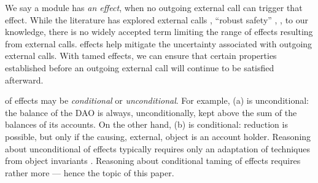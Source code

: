 We say a module has \emph{\tamed an effect}, when no outgoing external call can trigger that effect.
  While the literature has explored external calls \cite{vanproving,cerise-jacm2024,vmsl-pldi2023,ddd}, ``robust safety'' \cite{gordonJefferyRobustSafety,robustSafetyPatrignani,abate2019journey}, \etc, to our knowledge, there is no widely accepted term limiting the range of effects resulting from external calls.
%
\Tamed effects help mitigate the uncertainty associated with outgoing external calls. 
With tamed effects, we can ensure that certain properties established before an outgoing external call will continue to be satisfied afterward.



 
 \Taming of effects may be   \emph{conditional} or \emph{unconditional}.
For example, (a) is unconditional: the balance of the DAO is always, unconditionally, kept above the sum of the balances of its accounts.
On the other hand, (b) is conditional: %
 reduction is possible, but only  if the causing, external, 
 object is an account holder. 
Reasoning about {unconditional}  \taming of  effects     typically requires only an adaptation of
  techniques from %
object  invariants \cite{staticsfull,DrossoFrancaMuellerSummers08,BarDelFahLeiSch04,objInvars,MuellerPoetzsch-HeffterLeavens06}.
  Reasoning about  {conditional} taming of    effects
requires rather more --- {hence} the topic of this paper. 

